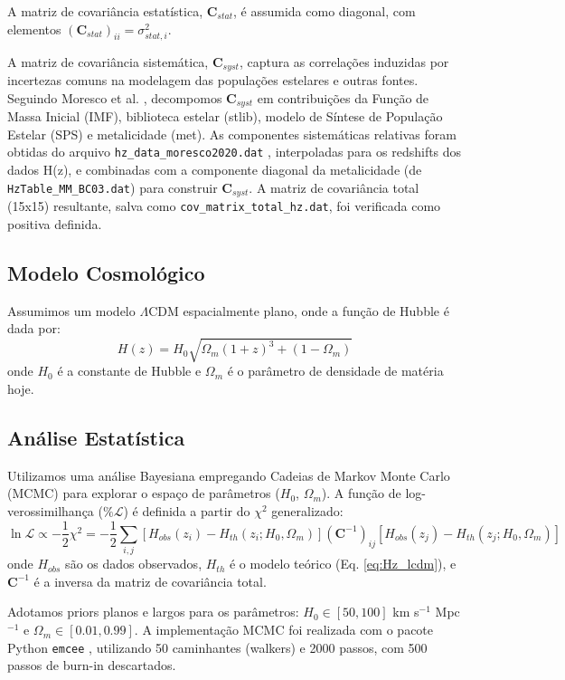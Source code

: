 \documentclass[11pt,a4paper]{article}
\begin{document}
A matriz de covariância estatística, $\mathbf{C}_{stat}$, é assumida como diagonal, com elementos $(\mathbf{C}_{stat})_{ii} = \sigma_{stat,i}^2$.

A matriz de covariância sistemática, $\mathbf{C}_{syst}$, captura as correlações induzidas por incertezas comuns na modelagem das populações estelares e outras fontes. Seguindo Moresco et al. \cite{ref:moresco_cov}, decompomos $\mathbf{C}_{syst}$ em contribuições da Função de Massa Inicial (IMF), biblioteca estelar (stlib), modelo de Síntese de População Estelar (SPS) e metalicidade (met). As componentes sistemáticas relativas foram obtidas do arquivo \texttt{hz\_data\_moresco2020.dat} \cite{ref:cc_repo}, interpoladas para os redshifts dos dados H(z), e combinadas com a componente diagonal da metalicidade (de \texttt{HzTable\_MM\_BC03.dat}) para construir $\mathbf{C}_{syst}$. A matriz de covariância total (15x15) resultante, salva como \texttt{cov\_matrix\_total\_hz.dat}, foi verificada como positiva definida.

\subsection{Modelo Cosmológico}
Assumimos um modelo $\Lambda$CDM espacialmente plano, onde a função de Hubble é dada por:
\begin{equation}
H(z) = H_0 \sqrt{\Omega_m (1+z)^3 + (1 - \Omega_m)}
\label{eq:Hz_lcdm}
\end{equation}
onde $H_0$ é a constante de Hubble e $\Omega_m$ é o parâmetro de densidade de matéria hoje.

\subsection{Análise Estatística}
Utilizamos uma análise Bayesiana empregando Cadeias de Markov Monte Carlo (MCMC) para explorar o espaço de parâmetros ($H_0$, $\Omega_m$). A função de log-verossimilhança ($\%\mathcal{L}$) é definida a partir do $\chi^2$ generalizado:
\begin{equation}
\ln \mathcal{L} \propto -\frac{1}{2} \chi^2 = -\frac{1}{2} \sum_{i,j} [H_{obs}(z_i) - H_{th}(z_i; H_0, \Omega_m)] (\mathbf{C}^{-1})_{ij} [H_{obs}(z_j) - H_{th}(z_j; H_0, \Omega_m)]
\label{eq:chi2}
\end{equation}
onde $H_{obs}$ são os dados observados, $H_{th}$ é o modelo teórico (Eq. \ref{eq:Hz_lcdm}), e $\mathbf{C}^{-1}$ é a inversa da matriz de covariância total.

Adotamos priors planos e largos para os parâmetros: $H_0 \in [50, 100]$ km s$^{-1}$ Mpc$^{-1}$ e $\Omega_m \in [0.01, 0.99]$. A implementação MCMC foi realizada com o pacote Python \texttt{emcee} \cite{ref:emcee}, utilizando 50 caminhantes (walkers) e 2000 passos, com 500 passos de burn-in descartados.
\end{document}
